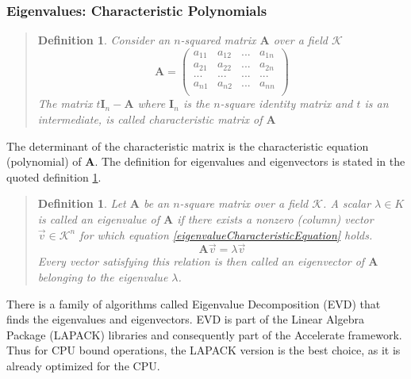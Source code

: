 \documentclass[11pt]{article}
\newtheorem{adef}[thm]{Definition}
\begin{document}
\subsubsection{Eigenvalues: Characteristic Polynomials}
\begin{quote}
	\begin{adef}
		Consider an $n$-squared matrix $\mathbf{A}$ over a field $\mathcal{K}$
		\begin{equation}
			\mathbf{A} = 
			\left(
			\begin{array}{cccc}
				a_{11}  &a_{12}  & ... &a_{1n}     \\
				a_{21}  &a_{22}  & ... &a_{2n}     \\
				...& ...& ...&... \\
				a_{n1}  &a_{n2}  & ... &a_{nn}     \\
			\end{array}
			\right)
		\end{equation}
		The matrix $t\mathbf{I}_n - \mathbf{A}$ where $\mathbf{I}_n$ is the $n$-square identity matrix and $t$ is an intermediate, is called characteristic matrix of $\mathbf{A}$
	\end{adef}
	\cite[281]{schaums-linear-algebra}
\end{quote}
The determinant of the characteristic matrix is the characteristic equation (polynomial) of $\mathbf{A}$.  The definition for eigenvalues and eigenvectors is stated in the quoted definition \ref{eigenvalueDefinition}.
\begin{quote}
\begin{adef}
	\label{eigenvalueDefinition}
Let $\mathbf{A}$ be an $n$-square matrix over a field $\mathcal{K}$.  A scalar $\lambda \in K$ is called an eigenvalue of $\mathbf{A}$ if there exists a nonzero (column) vector $\vec{v}\in \mathcal{K}^n$ for which equation \ref{eigenvalueCharacteristicEquation} holds.
\begin{equation}
\mathbf{A}\vec{v} = \lambda \vec{v}  \label{eigenvalueCharacteristicEquation}
\end{equation}
Every vector satisfying this relation is then called an eigenvector of $\mathbf{A}$ belonging to the eigenvalue $\lambda$.
\end{adef}
\cite[284]{schaums-linear-algebra}
\end{quote}
There is a family of algorithms called Eigenvalue Decomposition (EVD) that finds the eigenvalues and eigenvectors.   EVD is part of the Linear Algebra Package (LAPACK) libraries and consequently part of the Accelerate framework\cite{apple-accelerate-framework}.  Thus for CPU bound operations, the LAPACK version is the best choice, as it is already optimized for the CPU.    %
\end{document}
